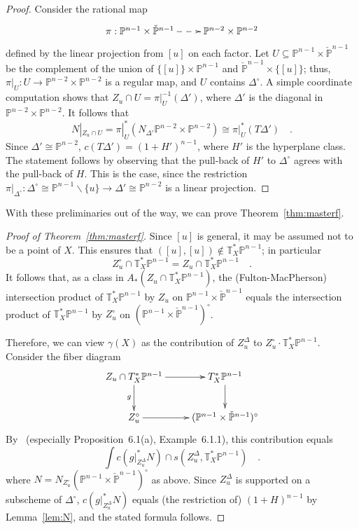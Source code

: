 \documentclass[11pt]{amsart}
\numberwithin{equation}{section}
\newcommand{\Pbb}{{\mathbb{P}}}
\newcommand{\cPbb}{{\check\Pbb}}
\newcommand{\Tbb}{{\mathbb{T}}}
\begin{document}
\begin{proof}
Consider the rational map
\[
\xymatrix{
\pi : \Pbb^{n-1}\times \cPbb^{n-1} \ar@{-->}[r] & \Pbb^{n-2}\times \Pbb^{n-2}
}
\]
defined by the linear projection from $[u]$ on each factor. Let $U\subseteq
\Pbb^{n-1}\times \cPbb^{n-1}$ be the complement of the union of $\{[u]\}\times \Pbb^{n-1}$
and $\cPbb^{n-1}\times \{[u]\}$; thus, $\pi|_U: U \to  \Pbb^{n-2}\times \Pbb^{n-2}$ is a regular
map, and $U$ contains $\Delta^\circ$. A simple coordinate computation
shows that $Z_u \cap U = \pi|_U^{-1}(\Delta')$, where $\Delta'$ is the diagonal in
$\Pbb^{n-2}\times \Pbb^{n-2}$. It follows that
\[
N|_{Z_u\cap U} = \pi|_U^*(N_{\Delta'} \Pbb^{n-2}\times \Pbb^{n-2})\cong \pi|_U^*(T\Delta')\quad.
\]
Since $\Delta'\cong \Pbb^{n-2}$, $c(T\Delta') = (1+H')^{n-1}$, where $H'$ is the hyperplane
class. The statement follows by observing that the pull-back of $H'$ to $\Delta^\circ$
agrees with the pull-back of $H$. This is the case, since the restriction
$\pi|_{\Delta^\circ}: \Delta^\circ \cong\Pbb^{n-1}\smallsetminus \{u\}\to \Delta'\cong \Pbb^{n-2}$ 
is a linear projection. 
\end{proof}

With these preliminaries out of the way, we can prove Theorem~\ref{thm:masterf}.

\begin{proof}[Proof of Theorem~\ref{thm:masterf}]
Since $[u]$ is general, it may be assumed not to be a point of $X$. This ensures
that $([u],[u])\not\in \Tbb^*_X\Pbb^{n-1}$; in particular
\[
Z_u^\circ\cap \Tbb^*_X\Pbb^{n-1} = Z_u \cap \Tbb^*_X\Pbb^{n-1}\quad.
\]
It follows that, as a class in $A_*(Z_u \cap \Tbb^*_X\Pbb^{n-1})$, the (Fulton-MacPherson) 
intersection product of $\Tbb^*_X\Pbb^{n-1}$ by $Z_u$ on $\Pbb^{n-1}\times \cPbb^{n-1}$ 
equals the intersection product of $\Tbb^*_X\Pbb^{n-1}$ by $Z_u^\circ$ on 
$(\Pbb^{n-1}\times \cPbb^{n-1})^\circ$.

Therefore, we can view $\gamma(X)$ as the contribution of $Z_u^\Delta$ to
$Z_u^\circ \cdot \Tbb^*_X\Pbb^{n-1}$. Consider the fiber diagram
\[
\xymatrix{
Z_u\cap T^*_X\Pbb^{n-1} \ar[r] \ar[d]_g & T^*_X\Pbb^{n-1} \ar[d] \\
Z_u^\circ \ar[r] & (\Pbb^{n-1}\times \cPbb^{n-1})^\circ
}
\]
By~\cite[\S6.1]{85k:14004} (especially Proposition~6.1(a), Example~6.1.1),
this contribution equals
\[
\int c(g|_{Z_u^\Delta}^* N)\cap s(Z_u^\Delta, \Tbb_X^*\Pbb^{n-1})\quad.
\]
where $N=N_{Z_u^\circ} (\Pbb^{n-1}\times \cPbb^{n-1})^\circ$ as above.
Since $Z_u^\Delta$ is supported on a subscheme of $\Delta^\circ$, 
$c(g|_{Z_u^\Delta}^* N)$ equals (the restriction of) $(1+H)^{n-1}$ by 
Lemma~\ref{lem:N}, and the stated formula follows.
\end{proof}
\end{document}
